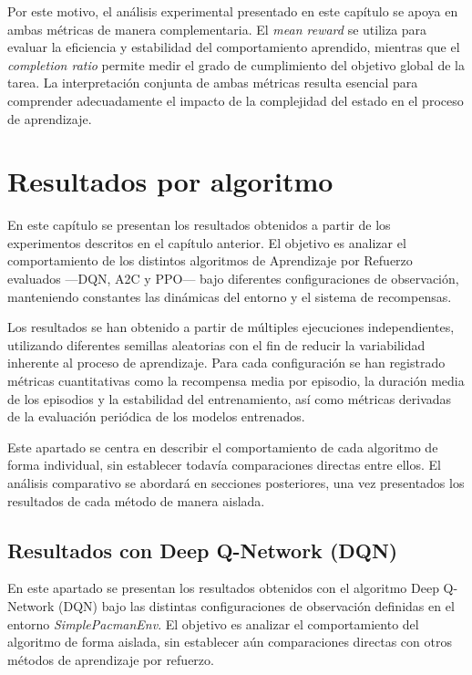 Por este motivo, el análisis experimental presentado en este capítulo se apoya en ambas métricas de manera complementaria. El \textit{mean reward} se utiliza para evaluar la eficiencia y estabilidad del comportamiento aprendido, mientras que el \textit{completion ratio} permite medir el grado de cumplimiento del objetivo global de la tarea. La interpretación conjunta de ambas métricas resulta esencial para comprender adecuadamente el impacto de la complejidad del estado en el proceso de aprendizaje.

\section{Resultados por algoritmo}

En este capítulo se presentan los resultados obtenidos a partir de los experimentos descritos en el capítulo anterior. El objetivo es analizar el comportamiento de los distintos algoritmos de Aprendizaje por Refuerzo evaluados —DQN, A2C y PPO— bajo diferentes configuraciones de observación, manteniendo constantes las dinámicas del entorno y el sistema de recompensas.

Los resultados se han obtenido a partir de múltiples ejecuciones independientes, utilizando diferentes semillas aleatorias con el fin de reducir la variabilidad inherente al proceso de aprendizaje. Para cada configuración se han registrado métricas cuantitativas como la recompensa media por episodio, la duración media de los episodios y la estabilidad del entrenamiento, así como métricas derivadas de la evaluación periódica de los modelos entrenados.

Este apartado se centra en describir el comportamiento de cada algoritmo de forma individual, sin establecer todavía comparaciones directas entre ellos. El análisis comparativo se abordará en secciones posteriores, una vez presentados los resultados de cada método de manera aislada.

\subsection{Resultados con Deep Q-Network (DQN)}

En este apartado se presentan los resultados obtenidos con el algoritmo Deep Q-Network (DQN) bajo las distintas configuraciones de observación definidas en el entorno \textit{SimplePacmanEnv}. El objetivo es analizar el comportamiento del algoritmo de forma aislada, sin establecer aún comparaciones directas con otros métodos de aprendizaje por refuerzo.

